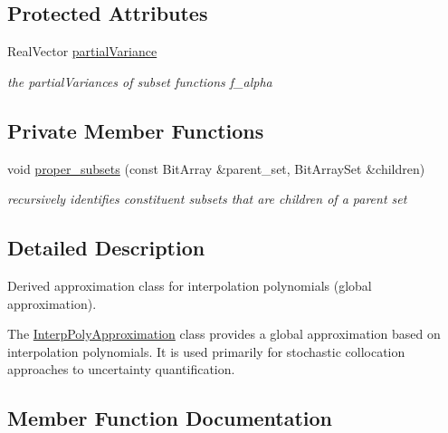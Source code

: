 \subsection*{Protected Attributes}
\begin{DoxyCompactItemize}
\item 
Real\+Vector \hyperlink{classPecos_1_1InterpPolyApproximation_a4699779299311e1ed28f77eb9ac6d768}{partial\+Variance}\label{classPecos_1_1InterpPolyApproximation_a4699779299311e1ed28f77eb9ac6d768}

\begin{DoxyCompactList}\small\item\em the partial\+Variances of subset functions f\+\_\+alpha \end{DoxyCompactList}\end{DoxyCompactItemize}
\subsection*{Private Member Functions}
\begin{DoxyCompactItemize}
\item 
void \hyperlink{classPecos_1_1InterpPolyApproximation_a821668b00c67fe972399fbb7dd3706bf}{proper\+\_\+subsets} (const Bit\+Array \&parent\+\_\+set, Bit\+Array\+Set \&children)
\begin{DoxyCompactList}\small\item\em recursively identifies constituent subsets that are children of a parent set \end{DoxyCompactList}\end{DoxyCompactItemize}


\subsection{Detailed Description}
Derived approximation class for interpolation polynomials (global approximation). 

The \hyperlink{classPecos_1_1InterpPolyApproximation}{Interp\+Poly\+Approximation} class provides a global approximation based on interpolation polynomials. It is used primarily for stochastic collocation approaches to uncertainty quantification. 

\subsection{Member Function Documentation}
